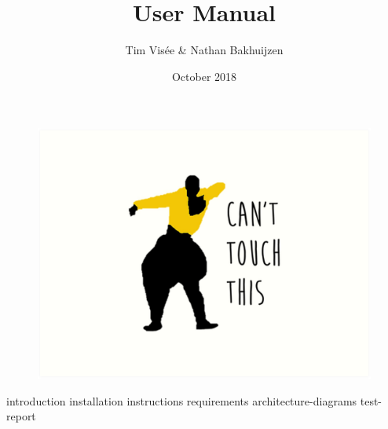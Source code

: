 \documentclass[a4paper]{article}
\title{User Manual}
\author{Tim Visée \& Nathan Bakhuijzen}
\date{October 2018}
\begin{document}
  \maketitle
  \begin{figure}[h]
    \centering
    \includegraphics[width=\linewidth]{cant-touch-this}
  \end{figure}
  \clearpage

  {introduction}
  {installation}
  {instructions}
  {requirements}
  {architecture-diagrams}
  {test-report}
\end{document}
